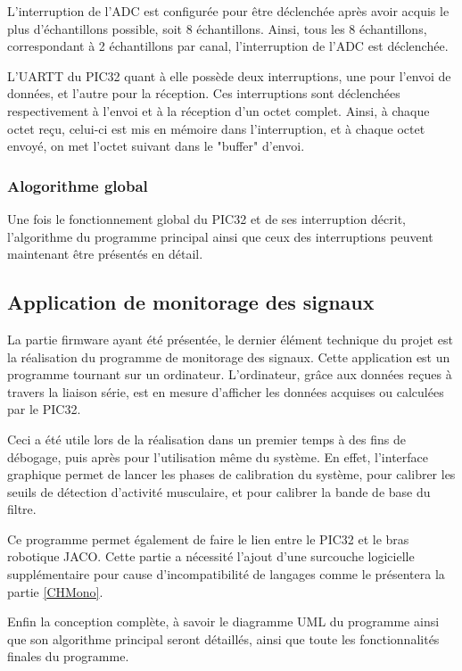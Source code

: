 \documentclass[letterpaper, twoside, 12pt, memoire, creativecommons, hyperref]{thETS}
\begin{document}
L'interruption de l'ADC est configurée pour être déclenchée après avoir acquis le plus d'échantillons possible, soit 8 échantillons. Ainsi, tous les 8 échantillons, correspondant à 2 échantillons par canal, l'interruption de l'ADC est déclenchée. 

L'UARTT du PIC32 quant à elle possède deux interruptions, une pour l'envoi de données, et l'autre pour la réception. Ces interruptions sont déclenchées respectivement à l'envoi et à la réception d'un octet complet. Ainsi, à chaque octet reçu, celui-ci est mis en mémoire dans l'interruption, et à chaque octet envoyé, on met l'octet suivant dans le "buffer" d'envoi.

\subsubsection{Alogorithme global}

Une fois le fonctionnement global du PIC32 et de ses interruption décrit, l'algorithme du programme principal ainsi que ceux des interruptions peuvent maintenant être présentés en détail. %

\subsection{Application de monitorage des signaux}

La partie firmware ayant été présentée, le dernier élément technique du projet est la réalisation du programme de monitorage des signaux. Cette application est un programme tournant sur un ordinateur. L'ordinateur, grâce aux données reçues à travers la liaison série, est en mesure d'afficher les données acquises ou calculées par le PIC32. 

Ceci a été utile lors de la réalisation dans un premier temps à des fins de débogage, puis après pour l'utilisation même du système. En effet, l'interface graphique permet de lancer les phases de calibration du système, pour calibrer les seuils de détection d'activité musculaire, et pour calibrer la bande de base du filtre. 

Ce programme permet également de faire le lien entre le PIC32 et le bras robotique JACO. Cette partie a nécessité l'ajout d'une surcouche logicielle supplémentaire pour cause d'incompatibilité de langages comme le présentera la partie \ref{CHMono}.

Enfin la conception complète, à savoir le diagramme UML du programme ainsi que son algorithme principal seront détaillés, ainsi que toute les fonctionnalités finales du programme.
\end{document}
